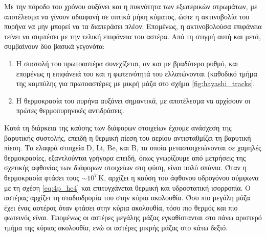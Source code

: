 Με την πάροδο του χρόνου αυξάνει και η πυκνότητα των εξωτερικών στρωμάτων, με αποτέλεσμα να γίνουν αδιαφανή σε οπτικά μήκη κύματος, ώστε η ακτινοβολία του πυρήνα να μην μπορεί να τα διαπεράσει πλέον. Επομένως, η ακτινοβολούσα επιφάνεια τείνει να συμπέσει με την τελική επιφάνεια του αστέρα. Από τη στιγμή αυτή και μετά, συμβαίνουν δύο βασικά γεγονότα:
\begin{enumerate}
    \item Η συστολή του πρωτοαστέρα συνεχίζεται, αν και με βραδύτερο ρυθμό, και επομένως η επιφάνειά του και η φωτεινότητά του ελλατώνονται (καθοδικό τμήμα της καμπύλης για πρωτοαστέρες με μικρή μάζα στο σχήμα \ref{fig:hayashi_tracks}.
    \item Η θερμοκρασία του πυρήνα αυξάνει σημαντικά, με αποτέλεσμα να αρχίσουν οι πρώτες θερμοπυρηνικές αντιδράσεις.
\end{enumerate}

Κατά τη διάρκεια της καύσης των διάφορων στοιχείων έχουμε ανάσχεση της βαρυτικής συστολής, επειδή η θερμική πίεση του αερίου αντισταθμίζει τη βαρυτική πίεση. Τα ελαφρά στοιχεία D, Li, Be, και B, τα οποία μεταστοιχειώνονται σε χαμηλές θερμοκρασίες, εξαντλούνται γρήγορα επειδή, όπως γνωρίζουμε από μετρήσεις της σχετικής αφθονίας των διάφορων στοιχείων στη φύση, είναι πολύ σπάνια. Όταν η θερμοκρασία φτάσει τους $\sim 10^7 \,\text{K}$, αρχίζει η καύση του άφθονου υδρογόνου σύμφωνα με τη σχέση \eqref{eq:4p_he4} και επιτυγχάνεται θερμική και υδροστατική ισορροπία. Ο αστέρας αρχίζει τη σταδιοδρομία του στην κύρια ακολουθία. Όσο πιο μεγάλη μάζα έχει ένας αστέρας όταν φτάσει στην κύρια ακολουθία, τόσο πιο θερμός και πιο φωτεινός είναι. Επομένως οι αστέρες μεγάλης μάζας εγκαθίστανται στο πάνω αριστερό τμήμα της κύριας ακολουθία, ενώ οι αστέρες μικρής μάζας στο κάτω δεξιό.


